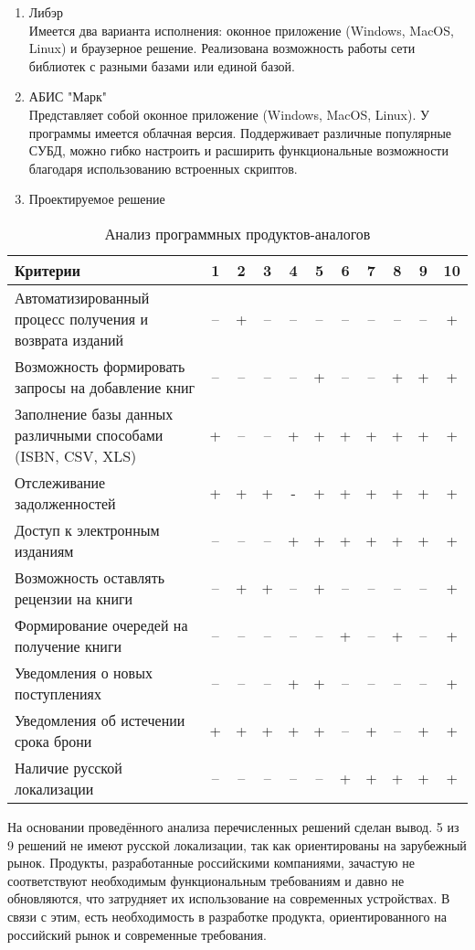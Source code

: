 \documentclass[./intro.tex]{subfiles}
\begin{document}
\begin{enumerate}
    \item Либэр \cite{Liber} \\
    Имеется два варианта исполнения: оконное приложение (Windows, MacOS, Linux) и браузерное решение. Реализована возможность работы сети библиотек с разными базами или единой базой.
    \item АБИС "Марк" \cite{ABISmark} \\
    Представляет собой оконное приложение (Windows, MacOS, Linux). У программы имеется облачная версия. Поддерживает различные популярные СУБД, можно гибко настроить и расширить функциональные возможности благодаря использованию встроенных скриптов.
    \item Проектируемое решение
\end{enumerate}

\begin{table}[h]
    \caption{Анализ программных продуктов-аналогов}
    \label{table:1}
    \begin{tabular}{|p{8.5cm}|c|c|c|c|c|c|c|c|c|c|}
        \hline
        Критерии & 1 & 2 & 3 & 4 & 5 & 6 & 7 & 8 & 9 & 10\\
        \hline
        Автоматизированный процесс получения и возврата изданий & – & + & – & – & – & – & – & – & – & + \\
        \hline
        Возможность формировать запросы на добавление книг & – & – & – & – & + & – & – & + & + & + \\
        \hline
        Заполнение базы данных различными способами (ISBN, CSV, XLS) & + & – & – & + & + & + & + & + & + & + \\
        \hline
        Отслеживание задолженностей & + & + & + & - & + & + & + & + & + & + \\
        \hline
        Доступ к электронным изданиям & – & – & – & + & + & + & + & + & + & + \\
        \hline
        Возможность оставлять рецензии на книги & – & + & + & – & + & – & – & – & – & + \\
        \hline
        Формирование очередей на получение книги & – & – & – & – & – & + & – & + & – & + \\
        \hline
        Уведомления о новых поступлениях & – & – & – & + & + & – & – & – & – & + \\
        \hline
        Уведомления об истечении срока брони & + & + & + & + & + & – & + & – & + & + \\
        \hline
        Наличие русской локализации & – & – & – & – & – & + & + & + & + & + \\
        \hline
    \end{tabular}    
\end{table}

\par На основании проведённого анализа перечисленных решений сделан вывод. 5 из 9 решений не имеют русской локализации, так как ориентированы на зарубежный рынок.
Продукты, разработанные российскими компаниями, зачастую не соответствуют необходимым функциональным требованиям и давно не обновляются, что затрудняет их использование на современных устройствах.
В связи с этим, есть необходимость в разработке продукта, ориентированного на российский рынок и современные требования.
\end{document}
